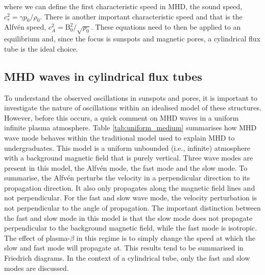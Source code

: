     where we can define the first characteristic speed in MHD, the sound speed, $c_s^2 = {\gamma p_0}/{\rho_0}$.
    There is another important characteristic speed and that is the Alfv\'{e}n speed, $c_A^2 = {\mathrm{B}_0^2}/{\sqrt{\rho_0}}$.
    These equations need to then be applied to an equilibrium and, since the focus is sunspots and magnetic pores, a cylindrical flux tube is the ideal choice.
    
\subsection{MHD waves in cylindrical flux tubes}

    To understand the observed oscillations in sunspots and pores, it is important to investigate the nature of oscillations within an idealised model of these structures.
    However, before this occurs, a quick comment on MHD waves in a uniform infinite plasma atmosphere.
    Table \ref{tab:uniform_medium} summarises how MHD wave mode behaves within the traditional model used to explain MHD to undergraduates.
    This model is a uniform unbounded (i.e., infinite) atmosphere with a background magnetic field that is purely vertical.
    Three wave modes are present in this model, the Alfv\'{e}n mode, the fast mode and the slow mode.
    To summarise, the Alfv\'{e}n perturbs the velocity in a perpendicular direction to its propagation direction. 
    It also only propagates along the magnetic field lines and not perpendicular.
    For the fast and slow wave mode, the velocity perturbation is not perpendicular to the angle of propagation.
    The important distinction between the fast and slow mode in this model is that the slow mode does not propagate perpendicular to the background magnetic field, while the fast mode is isotropic.
    The effect of plasma-$\beta$ in this regime is to simply change the speed at which the slow and fast mode will propagate at.  
    This results tend to be summarised in Friedrich diagrams. 
    In the context of a cylindrical tube, only the fast and slow modes are discussed.
             
